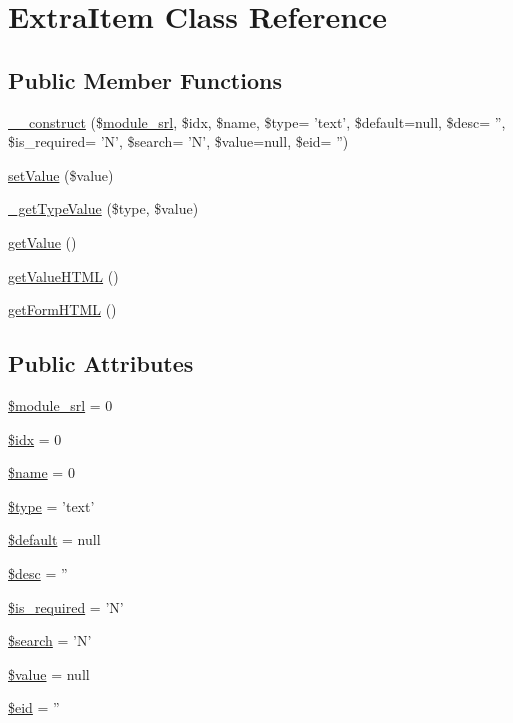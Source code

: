 \hypertarget{classExtraItem}{\section{Extra\-Item Class Reference}
\label{classExtraItem}
}
\subsection*{Public Member Functions}
\begin{DoxyCompactItemize}
\item 
\hyperlink{classExtraItem_af89705b804335fd1aa8be2f13a61444c}{\-\_\-\-\_\-construct} (\$\hyperlink{ko_8install_8php_a370bb6450fab1da3e0ed9f484a38b761}{module\-\_\-srl}, \$idx, \$name, \$type= 'text', \$default=null, \$desc= '', \$is\-\_\-required= 'N', \$search= 'N', \$value=null, \$eid= '')
\item 
\hyperlink{classExtraItem_a6bec289dc0622bd882a36cb9b5680b03}{set\-Value} (\$value)
\item 
\hyperlink{classExtraItem_ac285a098cdd05b2c152b3d94c8cb95db}{\-\_\-get\-Type\-Value} (\$type, \$value)
\item 
\hyperlink{classExtraItem_a61ff542aa57144ac9e8d20d40f426486}{get\-Value} ()
\item 
\hyperlink{classExtraItem_a7784f081919e81e4a41ab0c250d6ca52}{get\-Value\-H\-T\-M\-L} ()
\item 
\hyperlink{classExtraItem_aaedac8843abdf391e8f4d22704606898}{get\-Form\-H\-T\-M\-L} ()
\end{DoxyCompactItemize}
\subsection*{Public Attributes}
\begin{DoxyCompactItemize}
\item 
\hyperlink{classExtraItem_a21cce86c0846b13228273314216e5ab9}{\$module\-\_\-srl} = 0
\item 
\hyperlink{classExtraItem_aadcda4aa903481b261d86bc50ab1c238}{\$idx} = 0
\item 
\hyperlink{classExtraItem_a32694a2408e9e2cca1d680356cf937d3}{\$name} = 0
\item 
\hyperlink{classExtraItem_ac965cc202d067c0449be9976045fd4be}{\$type} = 'text'
\item 
\hyperlink{classExtraItem_a8499b54a8ec7aa3e3a40201d1458ffe5}{\$default} = null
\item 
\hyperlink{classExtraItem_a47059cf3ac48f0d31c5358fa5e97f106}{\$desc} = ''
\item 
\hyperlink{classExtraItem_a616da9975ea87e9b61b6b9a2daf5e769}{\$is\-\_\-required} = 'N'
\item 
\hyperlink{classExtraItem_a086e30bc8e2d078ad1108d00ae58a60c}{\$search} = 'N'
\item 
\hyperlink{classExtraItem_a46622b49026acdfce833d5118a43986d}{\$value} = null
\item 
\hyperlink{classExtraItem_a8a68f26bb602679ebf4095e774425092}{\$eid} = ''
\end{DoxyCompactItemize}


